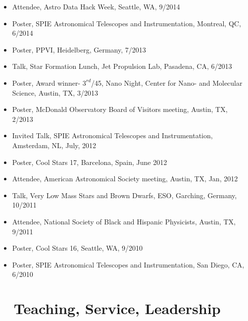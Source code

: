 \documentclass[10pt,letterpaper]{article}
\begin{document}
\begin{itemize}
    \item Attendee, Astro Data Hack Week, Seattle, WA, 9/2014
    \item Poster, SPIE Astronomical Telescopes and Instrumentation, Montreal, QC, 6/2014
    \item Poster, PPVI, Heidelberg, Germany, 7/2013
    \item Talk, Star Formation Lunch, Jet Propulsion Lab, Pasadena, CA, 6/2013
    \item Poster, Award winner- $3^{rd}$/45, Nano Night, Center for Nano- and Molecular Science, Austin, TX, 3/2013
    \item Poster, McDonald Observatory Board of Visitors meeting, Austin, TX, 2/2013
    \item Invited Talk, SPIE Astronomical Telescopes and Instrumentation, Amsterdam, NL, July, 2012
    \item Poster, Cool Stars 17, Barcelona, Spain, June 2012
    \item Attendee, American Astronomical Society meeting, Austin, TX, Jan, 2012
    \item Talk, Very Low Mass Stars and Brown Dwarfs, ESO, Garching, Germany, 10/2011
    \item Attendee, National Society of Black and Hispanic Physicists, Austin, TX, 9/2011
    \item Poster, Cool Stars 16, Seattle, WA, 9/2010
    \item Poster, SPIE Astronomical Telescopes and Instrumentation, San Diego, CA, 6/2010
\end{itemize}


\section*{\faChalkboardTeacher ~ Teaching, Service, Leadership}
\end{document}
